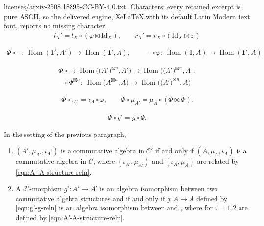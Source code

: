 \documentclass[10pt,a4paper]{amsart}
\begin{document}
licenses/arxiv-2508.18895-CC-BY-4.0.txt. Characters: every retained excerpt is pure ASCII, so the delivered engine, XeLaTeX with its default Latin Modern text font, reports no missing character.
\begin{gather}\label{eqn:l'-r'-gen-def}
l_X' = l_X\circ(\varphi\boxtimes\mathrm{Id}_X),\qquad r_X'=r_X\circ(\mathrm{Id}_X\boxtimes\varphi)
\end{gather}

\begin{gather}\label{eqn:A0-iso}
\Phi\circ -\colon\ \operatorname{Hom}(\mathbf{1}',A')\longrightarrow\operatorname{Hom}(\mathbf{1}',A),\qquad -\circ\varphi\colon\ \operatorname{Hom}(\mathbf{1},A)\longrightarrow\operatorname{Hom}(\mathbf{1}',A)
\end{gather}

\begin{gather}
\Phi\circ -\colon\ \operatorname{Hom}\bigl(\bigl(A'\bigr)^{\boxtimes n},A'\bigr)\longrightarrow\operatorname{Hom}\bigl(\bigl(A'\bigr)^{\boxtimes n},A\bigr),\nonumber\\ -\circ\Phi^{\boxtimes n}\colon\ \operatorname{Hom}\bigl(A^{\boxtimes n},A\bigr)\longrightarrow\operatorname{Hom}\bigl(\bigl(A'\bigr)^{\boxtimes n},A\bigr)\label{eqn:An-iso}
\end{gather}

\begin{gather}\label{eqn:A'-A-structure-reln}
\Phi\circ\iota_{A'} =\iota_A\circ\varphi,\qquad \Phi\circ\mu_{A'} =\mu_A\circ(\Phi\boxtimes\Phi).
\end{gather}

\begin{gather}\label{eqn:g'-g-reln}
\Phi\circ g' = g\circ\Phi.
\end{gather}

\begin{Theorem}\label{thm:C'-alg-to-C-alg}
In the setting of the previous paragraph,
\begin{enumerate}\itemsep=0pt
\item[$(1)$] $(A',\mu_{A'},\iota_{A'})$ is a commutative algebra in $\mathcal{C}'$ if and only if $(A,\mu_A,\iota_A)$ is a commutative algebra in $\mathcal{C}$, where $(\iota_{A'},\mu_{A'})$ and $(\iota_A,\mu_A)$ are related by \eqref{eqn:A'-A-structure-reln}.

\item[$(2)$] A $\mathcal{C}'$-morphism $g'\colon A'\rightarrow A'$ is an algebra isomorphism between two commutative algebra structures  and  if and only if $g\colon A\rightarrow A$ defined by \eqref{eqn:g'-g-reln} is an~algebra isomorphism between  and , where  for $i=1,2$ are defined by \eqref{eqn:A'-A-structure-reln}.
\end{enumerate}
\end{Theorem}
\end{document}
